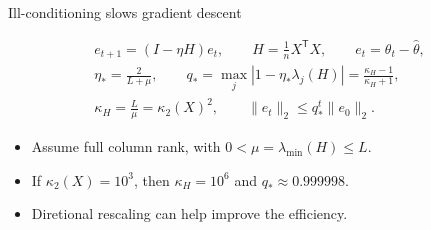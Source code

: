 \begin{frame}{Ill-conditioning slows gradient descent}
\begin{definitionbox}
\[
\begin{gathered}
e_{t+1}=(I-\eta H)e_t,\qquad H=\frac1nX^{\mathsf T}X,\qquad e_t=\theta_t-\widehat\theta,\\
\eta_* =\frac{2}{L+\mu},\qquad
q_* =\max_j|1-\eta_*\lambda_j(H)|
 =\frac{\kappa_H-1}{\kappa_H+1},\\
\kappa_H=\frac{L}{\mu}=\kappa_2(X)^2,\qquad
\lVert e_t\rVert_2\le q_*^t\lVert e_0\rVert_2.
\end{gathered}
\]
\end{definitionbox}
\small
\begin{itemize}\setlength{\itemsep}{4pt}
\item Assume full column rank, with $0<\mu=\lambda_{\min}(H)\le L$.
\item If $\kappa_2(X)=10^3$, then $\kappa_H=10^6$ and $q_*\approx0.999998$.
\item Diretional rescaling can help improve the efficiency. 
\end{itemize}
\end{frame}

